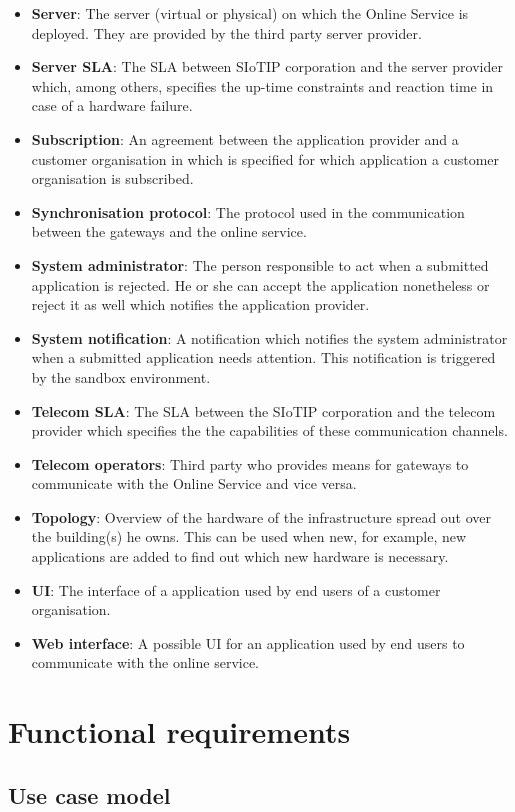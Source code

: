 \documentclass[english]{sareport}
\begin{document}
\begin{itemize}
	\item \textbf{Server}: The server (virtual or physical) on which the Online Service is deployed. They are provided by the third party server provider.
	\item \textbf{Server SLA}: The SLA between SIoTIP corporation and the server provider which, among others, specifies the up-time constraints and reaction time in case of a hardware failure.
	\item \textbf{Subscription}: An agreement between the application provider and a customer organisation in which is specified for which application a customer organisation is subscribed.
	\item \textbf{Synchronisation protocol}: The protocol used in the communication between the gateways and the online service.
	\item \textbf{System administrator}: The person responsible to act when a submitted application is rejected. He or she can accept the application nonetheless or reject it as well which notifies the application provider.
	\item \textbf{System notification}: A notification which notifies the system administrator when a submitted application needs attention. This notification is triggered by the sandbox environment.
	\item \textbf{Telecom SLA}: The SLA between the SIoTIP corporation and the telecom provider which specifies the the capabilities of these communication channels.
	\item \textbf{Telecom operators}: Third party who provides means for gateways to communicate with the Online Service and vice versa.
	\item \textbf{Topology}: Overview of the hardware of the infrastructure spread out over the building(s) he owns. This can be used when new, for example, new applications are added to find out which new hardware is necessary.
	\item \textbf{UI}: The interface of a application used by end users of a customer organisation.
	\item \textbf{Web interface}: A possible UI for an application used by end users to communicate with the online service.
\end{itemize}

\chapter{Functional requirements}\label{sec:functional}
\section*{Use case model}
\end{document}
